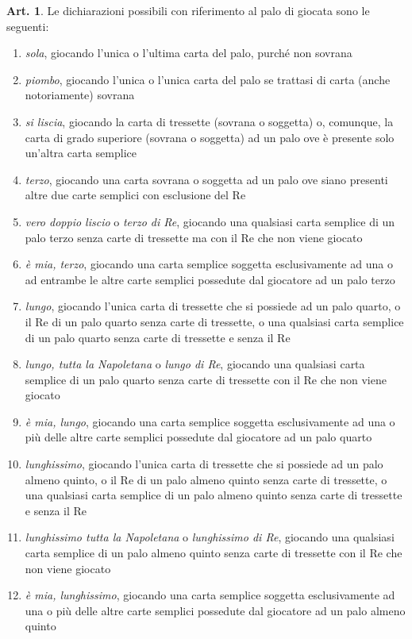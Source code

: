\documentclass[italian,a4paper]{book}
\theoremstyle{definition}
\newtheorem{art}{Art.}
\newenvironment{packedenum}{
\begin{enumerate}
  \setlength{\itemsep}{1pt}
  \setlength{\parskip}{0pt}
  \setlength{\parsep}{0pt}
}{\end{enumerate}}
\begin{document}
\begin{art}\label{classic.dich.list}
Le dichiarazioni possibili con riferimento al palo di giocata sono le seguenti:
\begin{packedenum}
\item \emph{sola},  giocando l'unica o l'ultima carta del palo, purché non sovrana
\item \emph{piombo},  giocando l'unica o l'unica carta del palo se trattasi di carta (anche notoriamente) sovrana
\item \emph{si liscia},  giocando la carta di tressette (sovrana o soggetta) o, comunque, la carta di grado superiore (sovrana o soggetta) ad un palo ove è presente solo un'altra carta semplice
\item \emph{terzo},  giocando una carta sovrana o soggetta ad un palo ove siano presenti altre due carte semplici con esclusione del Re
\item \emph{vero doppio liscio} o \emph{terzo di Re},  giocando una qualsiasi carta semplice di un palo terzo senza carte di tressette ma con il Re che non viene giocato
\item \emph{è mia, terzo},  giocando una carta semplice soggetta esclusivamente ad una o ad entrambe le altre carte semplici possedute dal giocatore ad un palo terzo
\item \emph{lungo},  giocando l'unica carta di tressette che si possiede ad un palo quarto, o il Re di un palo quarto senza carte di tressette, o una qualsiasi carta semplice di un palo quarto senza carte di tressette e senza il Re
\item \emph{lungo, tutta la Napoletana} o \emph{lungo di Re},  giocando una qualsiasi carta semplice di un palo quarto senza carte di tressette con il Re che non viene giocato
\item \emph{è mia, lungo},  giocando una carta semplice soggetta esclusivamente ad una o più delle altre carte semplici possedute dal giocatore ad un palo quarto
\item \emph{lunghissimo},  giocando l'unica carta di tressette che si possiede ad un palo almeno quinto, o il Re di un palo almeno quinto senza carte di tressette, o una qualsiasi carta semplice di un palo almeno quinto senza carte di tressette e senza il Re
\item \emph{lunghissimo tutta la Napoletana} o \emph{lunghissimo di Re},  giocando una qualsiasi carta semplice di un palo almeno quinto senza carte di tressette con il Re che non viene giocato
\item \emph{è mia, lunghissimo},  giocando una carta semplice soggetta esclusivamente ad una o più delle altre carte semplici possedute dal giocatore ad un palo almeno quinto

\end{packedenum}
\end{art}
\end{document}

